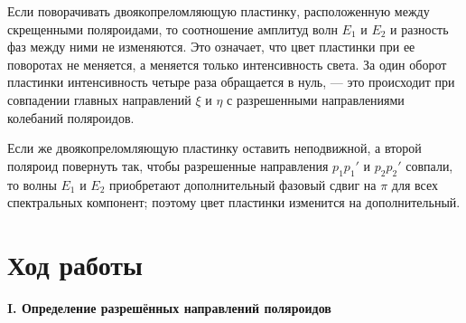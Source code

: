 \documentclass[12pt,a4paper]{article}
\begin{document}
	
	Если поворачивать двоякопреломляющую пластинку, расположенную между скрещенными поляроидами, то соотношение амплитуд волн $E_1$ и $E_2$ и разность фаз между ними не изменяются. Это означает, что цвет пластинки при ее поворотах не меняется, а меняется только интенсивность света. За один оборот пластинки интенсивность четыре раза обращается в нуль, — это происходит при совпадении главных направлений $\xi$ и $\eta$ с разрешенными направлениями колебаний поляроидов.
	
	Если же двоякопреломляющую пластинку оставить неподвижной, а второй поляроид повернуть так, чтобы разрешенные направления $p_1 p_1'$ и $p_2 p_2'$ совпали, то волны $E_1$ и $E_2$ приобретают дополнительный фазовый сдвиг на $\pi$ для всех спектральных компонент; поэтому цвет пластинки изменится на дополнительный.
	

    \section*{Ход работы}

    \begin{center}
		\textbf{I. Определение разрешённых направлений поляроидов}
	\end{center}
\end{document}
